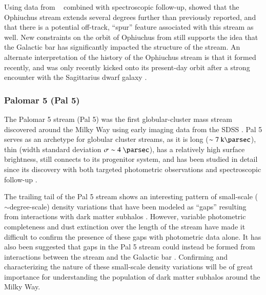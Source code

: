 \documentclass[final,5p,times,twocolumn,authoryear]{elsarticle}
\begin{document}
Using data from \gaia\  combined with spectroscopic follow-up,
\citet{caldwell:2020} showed that the Ophiuchus stream extends several degrees further
than previously reported, and that there is a potential off-track, ``spur'' feature
associated with this stream as well.
New constraints on the orbit of Ophiuchus from \citet{caldwell:2020} still supports the
idea that the Galactic bar has significantly impacted the structure of the stream.
An alternate interpretation of the history of the Ophiuchus stream is that it formed
recently, and was only recently kicked onto its present-day orbit after a strong
encounter with the Sagittarius dwarf galaxy \citep{lane:2020}.



\subsubsection{Palomar 5 (Pal 5)}
\label{sec:pal5}

The Palomar 5 stream (Pal 5) was the first globular-cluster mass stream discovered
around the Milky Way using early imaging data from the SDSS \citep{odenkirchen:2001,
rockosi:2002, grillmair:2006-pal5}.
Pal 5 serves as an archetype for globular cluster streams, as it is long ($\sim
7~\kpc$), thin (width standard deviation $\sigma \sim 4~\unit{\parsec}$), has a
relatively high surface brightness, still connects to its progenitor system, and has
been studied in detail since its discovery with both targeted photometric observations
\citep{ibata:2016, bonaca:2020} and spectroscopic follow-up \citep{kuzma:2015,
ishigaki:2016, ibata:2017, kuzma:2022}.

The trailing tail of the Pal 5 stream shows an interesting pattern of small-scale
($\sim$degree-scale) density variations that have been modeled as ``gaps'' resulting
from interactions with dark matter subhalos \citep{carlberg:2012, erkal:2017}.
However, variable photometric completeness and dust extinction over the length of the
stream have made it difficult to confirm the presence of these gaps with photometric
data alone.
It has also been suggested that gaps in the Pal 5 stream could instead be formed from
interactions between the stream and the Galactic bar \citep{pearson:2017}.
Confirming and characterizing the nature of these small-scale density variations will be
of great importance for understanding the population of dark matter subhalos around the
Milky Way.
\end{document}
